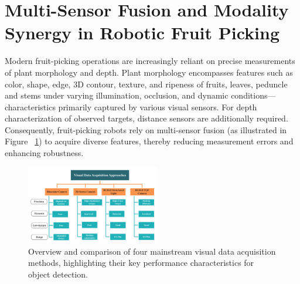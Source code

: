 \documentclass{ieeeaccess}
\begin{document}

\section{Multi-Sensor Fusion and Modality Synergy in Robotic Fruit Picking}

Modern fruit-picking operations are increasingly reliant on precise measurements of plant morphology and depth. Plant morphology encompasses features such as color, shape, edge, 	3D contour, texture, and ripeness of fruits, leaves, peduncle and stems under varying illumination, occlusion, and dynamic conditions—characteristics primarily captured by various visual sensors. For depth characterization of observed targets, distance sensors are additionally required. 
Consequently, fruit-picking robots rely on multi-sensor fusion (as illustrated in Figure ~\ref{fig:camera}) to acquire diverse features, thereby reducing measurement errors and enhancing robustness.
\begin{figure}[hbtp]
\centering
\includegraphics[width=0.52\textwidth]{fig_camera1.png}
\caption{Overview and comparison of four mainstream visual data acquisition methods, highlighting their key performance characteristics for object detection.}
\label{fig:camera}
\end{figure}
\end{document}
